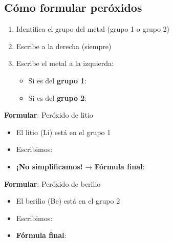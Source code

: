\subsection{Cómo formular peróxidos}

\begin{enumerate}
    \item Identifica el grupo del metal (grupo 1 o grupo 2)
    \item Escribe  a la derecha (siempre)
    \item Escribe el metal a la izquierda:
    \begin{itemize}
        \item Si es del \textbf{grupo 1}: 
        \item Si es del \textbf{grupo 2}: 
    \end{itemize}
\end{enumerate}

\begin{example}
    \textbf{Formular}: Peróxido de litio

    \begin{itemize}
        \item El litio (Li) está en el grupo 1
        \item Escribimos: 
        \item \textbf{¡No simplificamos!} → \textbf{Fórmula final}: 
    \end{itemize}

    \vspace{0.3cm}

    \textbf{Formular}: Peróxido de berilio

    \begin{itemize}
        \item El berilio (Be) está en el grupo 2
        \item Escribimos: 
        \item \textbf{Fórmula final}: 
    \end{itemize}
\end{example}

